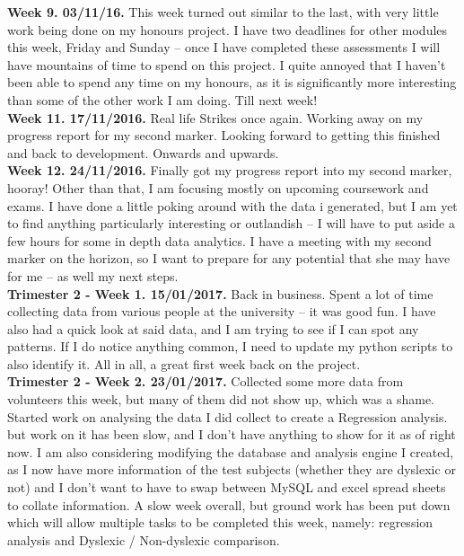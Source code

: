 \begin{appendices}
		\textbf{Week 9. 03/11/16.}
		This week turned out similar to the last, with very little work being done on my honours project.
		I have two deadlines for other modules this week, Friday and Sunday – once I have completed these assessments I will have mountains of time to spend on this project.
		I quite annoyed that I haven’t been able to spend any time on my honours, as it is significantly more interesting than some of the other work I am doing.
		Till next week!\\
		
		\textbf{Week 11. 17/11/2016.}
		Real life Strikes once again.
		Working away on my progress report for my second marker.
		Looking forward to getting this finished and back to development.
		Onwards and upwards.\\
		
		\textbf{Week 12. 24/11/2016.}
		Finally got my progress report into my second marker, hooray!
		Other than that, I am focusing mostly on upcoming coursework and exams.
		I have done a little poking around with the data i generated, but I am yet to find anything particularly interesting or outlandish – I will have to put aside a few hours for some in depth data analytics.
		I have a meeting with my second marker on the horizon, so I want to prepare for any potential that she may have for me – as well my next steps.\\
		
		\textbf{Trimester 2 - Week 1. 15/01/2017.}
		Back in business.
		Spent a lot of time collecting data from various people at the university – it was good fun.
		I have also had a quick look at said data, and I am trying to see if I can spot any patterns. If I do notice anything common, I need to update my python scripts to also identify it.
		All in all, a great first week back on the project.
		\\
		
		\textbf{Trimester 2 - Week 2. 23/01/2017.}
		Collected some more data from volunteers this week, but many of them did not show up, which was a shame.
		Started work on analysing the data I did collect to create a Regression analysis. but work on it has been slow, and I don’t have anything to show for it as of right now.
		I am also considering modifying the database and analysis engine I created, as I now have more information of the test subjects (whether they are dyslexic or not) and I don’t want to have to swap between MySQL and excel spread sheets to collate information.
		A slow week overall, but ground work has been put down which will allow multiple tasks to be completed this week, namely: regression analysis and Dyslexic / Non-dyslexic comparison.\\
		

\end{appendices}
